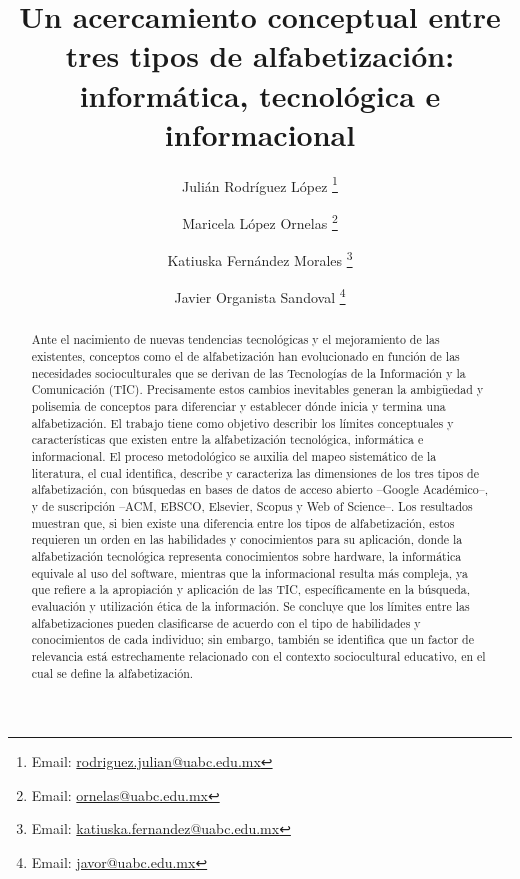 \documentclass{textolivre}
\title{Un acercamiento conceptual entre tres tipos de alfabetización: informática, tecnológica e informacional}
\author[1]{Julián Rodríguez López \orcid{0000-0001-5926-4519} \thanks{Email: \url{rodriguez.julian@uabc.edu.mx}}}
\author[1]{Maricela López Ornelas \orcid{0000-0002-4215-5591} \thanks{Email: \url{ornelas@uabc.edu.mx}}}
\author[1]{Katiuska Fernández Morales \orcid{0000-0002-6525-2298} \thanks{Email: \url{katiuska.fernandez@uabc.edu.mx}}}
\author[1]{Javier Organista Sandoval \orcid{0000-0001-8101-5084} \thanks{Email: \url{javor@uabc.edu.mx}}}
\affil[1]{Universidad Autónoma de Baja California, México.}
\begin{document}
\maketitle

\begin{polyabstract}
\begin{abstract}
Ante el nacimiento de nuevas tendencias tecnológicas y el mejoramiento de las existentes, conceptos como el de alfabetización han evolucionado en función de las necesidades socioculturales que se derivan de las Tecnologías de la Información y la Comunicación (TIC). Precisamente estos cambios inevitables generan la ambigüedad y polisemia de conceptos para diferenciar y establecer dónde inicia y termina una alfabetización. El trabajo tiene como objetivo describir los límites conceptuales y características que existen entre la alfabetización tecnológica, informática e informacional. El proceso metodológico se auxilia del mapeo sistemático de la literatura, el cual identifica, describe y caracteriza las dimensiones de los tres tipos de alfabetización, con búsquedas en bases de datos de acceso abierto –Google Académico–, y de suscripción –ACM, EBSCO, Elsevier, Scopus y Web of Science–. Los resultados muestran que, si bien existe una diferencia entre los tipos de alfabetización, estos requieren un orden en las habilidades y conocimientos para su aplicación, donde la alfabetización tecnológica representa conocimientos sobre hardware, la informática equivale al uso del software, mientras que la informacional resulta más compleja, ya que refiere a la apropiación y aplicación de las TIC, específicamente en la búsqueda, evaluación y utilización ética de la información. Se concluye que los límites entre las alfabetizaciones pueden clasificarse de acuerdo con el tipo de habilidades y conocimientos de cada individuo; sin embargo, también se identifica que un factor de relevancia está estrechamente relacionado con el contexto sociocultural educativo, en el cual se define la alfabetización.

\end{abstract}


\end{polyabstract}
\end{document}
